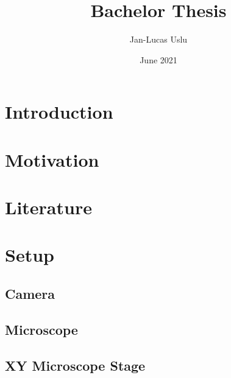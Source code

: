 \documentclass{article}
\title{Bachelor Thesis}
\author{Jan-Lucas Uslu}
\date{June 2021}
\begin{document}
\maketitle
\newpage

\tableofcontents
\newpage

\section{Introduction}

\section{Motivation}



\section{Literature}


\section{Setup}

\subsection{Camera}

\subsection{Microscope}

\subsection{XY Microscope Stage}

\end{document}
